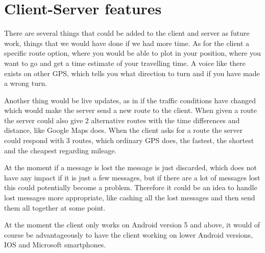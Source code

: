 

\section{Client-Server features}
There are several things that could be added to the client and server as future work, things that we would have done if we had more time. 
As for the client a specific route option, where you would be able to plot in your position, where you want to go and get a time estimate of your travelling time. A voice like there exists on other GPS, which tells you what direction to turn and if you have made a wrong turn.

Another thing would be live updates, as in if the traffic conditions have changed which would make the server send a new route to the client. When given a route the server could also give 2 alternative routes with the time differences and distance, like Google Maps does. 
When the client asks for a route the server could respond with 3 routes, which ordinary GPS does, the fastest, the shortest and the cheapest regarding  mileage.

At the moment if a message is lost the message is just discarded, which does not have any impact if it is just a few messages, but if there are a lot of messages lost this could potentially become a problem. Therefore it could be an idea to handle lost messages more appropriate, like cashing all the lost messages and then send them all together at some point.

At the moment the client only works on Android version 5 and above, it would of course be advantageously to have the client working on lower Android versions, IOS and Microsoft smartphones.
